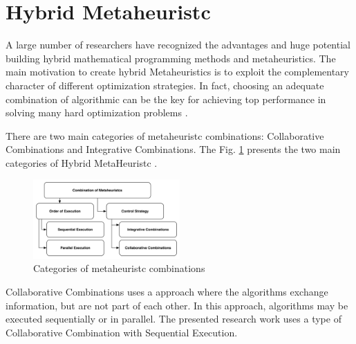\section{Hybrid Metaheuristc}


A large  number of researchers have recognized the advantages and huge potential building
hybrid mathematical programming methods and metaheuristics.
The main motivation to create hybrid Metaheuristics is to exploit the complementary character of different optimization strategies. In fact, choosing an adequate combination of algorithmic can be the key for achieving top performance in solving many hard optimization problems \cite{Puchinger2005} \cite{Blum2012}.


There are two main categories of metaheuristc combinations: Collaborative Combinations and Integrative Combinations. The Fig. \ref{fig:metaheuristc} presents the two main categories of Hybrid MetaHeuristc \cite{Puchinger2005}.

\begin{figure}[h]
\includegraphics[width=0.5\textwidth]{./images/metaheuristc2.png}
\caption{Categories of metaheuristc combinations \cite{Puchinger2005} }
\label{fig:metaheuristc}
\end{figure}

Collaborative Combinations uses a approach where the  algorithms exchange information, but are not part of each other. In this approach,  algorithms may be executed sequentially or in parallel. The presented research work uses a type of  Collaborative Combination with Sequential Execution.

